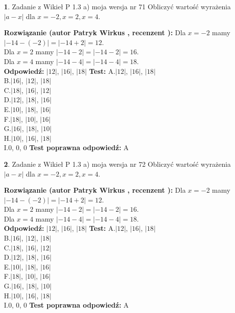 \documentclass[12pt, a4paper]{article}
\theoremstyle{definition} %
\newtheorem{zad}{}
\newcommand{\zadStart}[1]{\begin{zad}#1\newline}
\newcommand{\zadStop}{\end{zad}}
\newcommand{\rozwStart}[2]{\noindent \textbf{Rozwiązanie (autor #1 , recenzent #2): }\newline}
\newcommand{\rozwStop}{\newline}
\newcommand{\odpStart}{\noindent \textbf{Odpowiedź:}\newline}
\newcommand{\odpStop}{\newline}
\newcommand{\testStart}{\noindent \textbf{Test:}\newline}
\newcommand{\testStop}{\newline}
\newcommand{\kluczStart}{\noindent \textbf{Test poprawna odpowiedź:}\newline}
\newcommand{\kluczStop}{\newline}
\begin{document}
\zadStart{Zadanie z Wikieł P 1.3 a) moja wersja nr 71}
Obliczyć wartość wyrażenia $|a - x|$ dla $x=-2,x=2,x=4$.
\zadStop
\rozwStart{Patryk Wirkus}{}
Dla $x = -2$ mamy $|-14 - (-2)| = |-14 + 2| = 12$.\\
Dla $x = 2$ mamy $|-14 - 2| = |-14 - 2| = 16$.\\
Dla $x = 4$ mamy $|-14 - 4| = |-14 - 4| = 18$.\\
\rozwStop
\odpStart
$|12|$, $|16|$, $|18|$
\odpStop
\testStart
A.$|12|$, $|16|$, $|18|$\\
B.$|16|$, $|12|$, $|18|$\\
C.$|18|$, $|16|$, $|12|$\\
D.$|12|$, $|18|$, $|16|$\\
E.$|10|$, $|18|$, $|16|$\\
F.$|18|$, $|10|$, $|16|$\\
G.$|16|$, $|18|$, $|10|$\\
H.$|10|$, $|16|$, $|18|$\\
I.$0$, $0$, $0$
\testStop
\kluczStart
A
\kluczStop



\zadStart{Zadanie z Wikieł P 1.3 a) moja wersja nr 72}
Obliczyć wartość wyrażenia $|a - x|$ dla $x=-2,x=2,x=4$.
\zadStop
\rozwStart{Patryk Wirkus}{}
Dla $x = -2$ mamy $|-14 - (-2)| = |-14 + 2| = 12$.\\
Dla $x = 2$ mamy $|-14 - 2| = |-14 - 2| = 16$.\\
Dla $x = 4$ mamy $|-14 - 4| = |-14 - 4| = 18$.\\
\rozwStop
\odpStart
$|12|$, $|16|$, $|18|$
\odpStop
\testStart
A.$|12|$, $|16|$, $|18|$\\
B.$|16|$, $|12|$, $|18|$\\
C.$|18|$, $|16|$, $|12|$\\
D.$|12|$, $|18|$, $|16|$\\
E.$|10|$, $|18|$, $|16|$\\
F.$|18|$, $|10|$, $|16|$\\
G.$|16|$, $|18|$, $|10|$\\
H.$|10|$, $|16|$, $|18|$\\
I.$0$, $0$, $0$
\testStop
\kluczStart
A
\kluczStop
\end{document}
